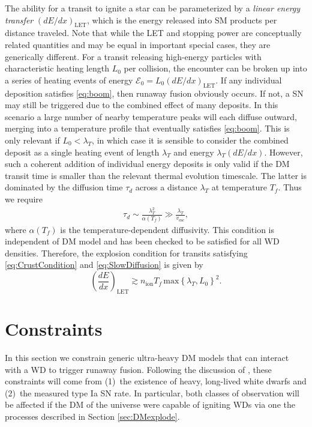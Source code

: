 \documentclass[twocolumn,showpacs,preprintnumbers,amsmath,amssymb,prd]{revtex4}
\newcommand{\Ez}{\mathcal{E}_0}
\begin{document}
The ability for a transit to ignite a star can be parameterized by a \emph{linear energy transfer} $(dE/dx)_\text{LET}$, which is the energy released into SM products per distance traveled.
Note that while the LET and stopping power are conceptually related quantities and may be equal in important special cases, they are generically different.
For a transit releasing high-energy particles with characteristic heating length $L_0$ per collision, the encounter can be broken up into a series of heating events of energy $\Ez = L_0 (d E/d x)_\text{LET}$.
If any individual deposition satisfies \eqref{eq:boom}, then runaway fusion obviously occurs.
If not, a SN may still be triggered due to the combined effect of many deposits.
In this scenario a large number of nearby temperature peaks will each diffuse outward, merging into a temperature profile that eventually satisfies \eqref{eq:boom}.
This is only relevant if $L_0 < \lambda_T$, in which case it is sensible to consider the combined deposit as a single heating event of length $\lambda_T$ and energy $\lambda_T (d E/d x)$.
However, such a coherent addition of individual energy deposits is only valid if the DM transit time is smaller than the relevant thermal evolution timescale.
The latter is dominated by the diffusion time $\tau_d$ across a distance $\lambda_T$ at temperature $T_f$.
Thus we require
\begin{align}
\tau_d \sim \frac{\lambda_T^2}{\alpha(T_f)} \gg \frac{\lambda_T}{v_\text{esc}},
\label{eq:SlowDiffusion}
\end{align}
where $\alpha(T_f)$ is the temperature-dependent diffusivity.
This condition is independent of DM model and has been checked to be satisfied for all WD densities.
Therefore, the explosion condition for transits satisfying \eqref{eq:CrustCondition} and \eqref{eq:SlowDiffusion} is given by
\begin{equation}
\label{eq:transitexplosion}
  \left( \frac{d E}{d x} \right)_\text{LET} \gtrsim n_\text{ion} T_f\, \text{max}\left\{\lambda_T, L_0 \right\}^2.
\end{equation}

\section{Constraints}
\label{sec:Constraints}

In this section we constrain generic ultra-heavy DM models that can interact with a WD to trigger runaway fusion.
Following the discussion of \cite{Graham:2015apa}, these constraints will come from (1)~the existence of heavy, long-lived white dwarfs and (2)~the measured type Ia SN rate.
In particular, both classes of observation will be affected if the DM of the universe were capable of igniting WDs via one the processes described in Section \ref{sec:DMexplode}.
\end{document}
